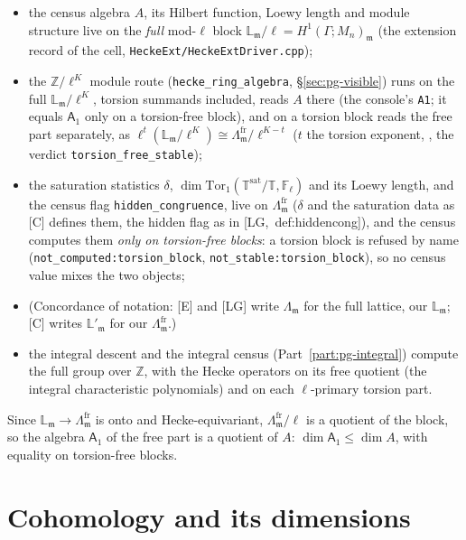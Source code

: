\documentclass[11pt]{article}
\newcommand{\Z}{\mathbb{Z}}
\newcommand{\Fl}{\mathbb{F}_\ell}
\newcommand{\T}{\mathbb{T}}
\newcommand{\m}{\mathfrak{m}}
\newcommand{\Ga}{\Gamma}
\newcommand{\code}[1]{\texttt{#1}}
\newcommand{\file}[1]{\texttt{#1}}
\begin{document}
\begin{itemize}[leftmargin=1.6em,itemsep=1pt]
\item the census algebra $A$, its Hilbert function, Loewy length and module structure live on the \emph{full} mod-$\ell$ block
  $\mathbb L_\m/\ell=H^{1}(\Ga;M_n)_\m$ (the extension record of the cell, \file{HeckeExt/HeckeExtDriver.cpp});
\item the $\Z/\ell^{K}$ module route (\code{hecke\_ring\_algebra}, \S\ref{sec:pg-visible}) runs on the full $\mathbb L_\m/\ell^{K}$, torsion
  summands included, reads $A$ there (the console's \code{A1}; it equals $\mathsf A_1$ only on a torsion-free block), and on a torsion block reads the free part separately, as $\ell^{t}(\mathbb L_\m/\ell^{K})
  \cong\Lambda^{\mathrm{fr}}_\m/\ell^{K-t}$ ($t$ the torsion exponent, {}, the verdict \code{torsion\_free\_stable});
\item the saturation statistics $\delta$, $\dim\mathrm{Tor}_1(\T^{\mathrm{sat}}/\T,\Fl)$ and its Loewy length, and the census flag
  \code{hidden\_congruence}, live on $\Lambda^{\mathrm{fr}}_\m$ ($\delta$ and the saturation data as [C] defines them, the hidden flag as in
  [LG,~def:hiddencong]), and the census computes them \emph{only on torsion-free
  blocks}: a torsion block is refused by name (\code{not\_computed:torsion\_block}, \code{not\_stable:torsion\_block}), so no census value
  mixes the two objects;
\item (Concordance of notation: [E] and [LG] write $\Lambda_\m$ for the full lattice, our $\mathbb L_\m$; [C] writes $\mathbb L'_\m$ for our $\Lambda^{\mathrm{fr}}_\m$.)
\item the integral descent and the integral census (Part~\ref{part:pg-integral}) compute the full group over $\Z$, with the Hecke operators
  on its free quotient (the integral characteristic polynomials) and on each $\ell$-primary torsion part.
\end{itemize}
Since $\mathbb L_\m\to\Lambda^{\mathrm{fr}}_\m$ is onto and Hecke-equivariant, $\Lambda^{\mathrm{fr}}_\m/\ell$ is a quotient of the block, so the
algebra $\mathsf A_1$ of the free part is a quotient of $A$: $\dim\mathsf A_1\le\dim A$, with equality on torsion-free blocks.

\part{Cohomology and its dimensions}\label{part:pg-cohomology}\label{part:pg-snippets}
\end{document}
